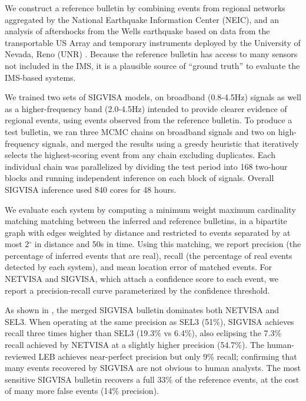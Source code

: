 \documentclass[twoside]{article} \usepackage{aistats2017}
\renewcommand{\deg}{\ensuremath{^\circ}}
\begin{document}
We construct a reference bulletin by combining events from regional networks aggregated by the
National Earthquake Information Center (NEIC),
and an analysis of aftershocks from the Wells earthquake based on data
from the transportable US Array and 
temporary instruments deployed by the University of Nevada, Reno (UNR)
\citep{smith2011preliminary}. Because the reference bulletin has access to many 
sensors not included in the IMS, it is a plausible source of ``ground
truth'' to evaluate the IMS-based systems. 

We trained two sets of SIGVISA models, on
broadband (0.8-4.5Hz) signals as well as a higher-frequency band
(2.0-4.5Hz) intended to provide clearer evidence of regional
events, using events observed from the reference bulletin. 
To produce a test bulletin, we ran three MCMC chains on
broadband signals and two on high-frequency signals, and merged the
results using a greedy heuristic that iteratively selects the
highest-scoring event from any chain excluding duplicates. Each
individual chain was parallelized by dividing the test period into 168
two-hour blocks and running independent inference on each block of
signals. Overall SIGVISA inference used 840 cores for 48 hours.

We evaluate each system by computing a minimum weight maximum
cardinality matching matching between the inferred and reference bulletins, in a bipartite
graph with edges weighted by distance and restricted to
events separated by at most $2\deg$ in distance and 50s in
time. Using this matching, we report precision (the percentage of inferred
events that are real), recall (the percentage of real events detected
by each system), and mean location error of matched events. For
NETVISA and SIGVISA, which attach a confidence score to each event, we
report a precision-recall curve parameterized by the confidence
threshold. 

As shown in , the merged SIGVISA
bulletin dominates both NETVISA and SEL3. When operating at the same
precision as SEL3 (51\%), SIGVISA achieves recall three times higher
than SEL3  (19.3\% vs 6.4\%), also eclipsing the 7.3\% recall achieved by NETVISA at a slightly higher
precision (54.7\%). The human-reviewed LEB achieves near-perfect precision
but only 9\% recall; confirming that many events recovered by SIGVISA
are not obvious to human analysts. The most sensitive SIGVISA bulletin
recovers a full 33\% of the reference events, at the cost of
many more false events (14\% precision). 
\end{document}
